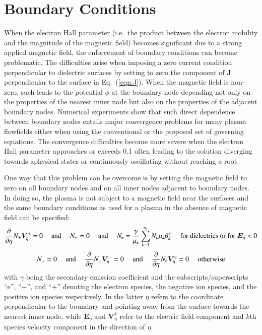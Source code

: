 \documentclass[twoside,onecolumn,10pt]{waflarticle}
\renewcommand{\vec}[1]{\bm{#1}}
\newcommand{\ns}{{n_{\rm s}}}
\renewcommand{\vec}[1]{\bm{ #1 }}
\begin{document}
	


\section{Boundary Conditions}


When the electron Hall parameter (i.e.\ the product between the electron mobility and the magnitude of the magnetic field) becomes significant due to a strong applied magnetic field, the enforcement of boundary conditions can become problematic. The difficulties arise when imposing a zero current condition perpendicular to dielectric surfaces by setting to zero the component of $\vec{J}$ perpendicular to the surface in Eq.\ (\ref{eqn:J}). When the magnetic field is non-zero, such leads to the potential $\phi$ at the boundary node depending not only on the properties of the nearest inner node but also on the properties of the adjacent boundary nodes. Numerical experiments show that such direct dependence between boundary nodes entails major convergence problems for many plasma flowfields either when using the conventional or the proposed set of governing equations. The convergence difficulties become more severe when the electron Hall parameter approaches or exceeds 0.1 often leading to the solution diverging towards aphysical states or continuously oscillating without reaching a root. 

One way that this problem can be overcome is by setting the magnetic field to zero on all boundary nodes and on all inner nodes adjacent to boundary nodes. In doing so, the plasma is not subject to a magnetic field near the surfaces and the same boundary conditions as used for a plasma in the absence of magnetic field can be specified:
%
\begin{equation}
\frac{\partial }{\partial \eta} N_+ \vec{V}^{+}_\eta = 0
{~~~~~\rm and~~~~~}
N_{-}=0
{~~~~~\rm and~~~~~}
N_{\rm e}=\frac{\gamma}{\mu_{\rm e}} \sum_{k=1}^\ns N_k \mu_k \beta_k^+
{~~~~~\rm for~dielectrics~or~for~}
\vec{E}_\eta<0
\end{equation}
%
%
\begin{equation}
N_{+}=0
{~~~~~\rm and~~~~~}
\frac{\partial }{\partial \eta} N_- \vec{V}^{-}_\eta = 0
{~~~~~\rm and~~~~~}
\frac{\partial }{\partial \eta} N_{\rm e} \vec{V}^{\rm e}_\eta= 0
{~~~~~\rm otherwise} 
\end{equation}
%
with $\gamma$ being the secondary emission coefficient and the subscripts/superscripts ``e'', ``$-$'', and ``$+$'' denoting the electron species, the negative ion species, and the positive ion species respectively. In the latter $\eta$ refers to the coordinate perpendicular to the boundary and pointing away from the surface towards the nearest inner node, while  $\vec{E}_\eta$ and $\vec{V}^k_\eta$ refer to the electric field component and $k$th species velocity component in the direction of $\eta$.   
\end{document}
